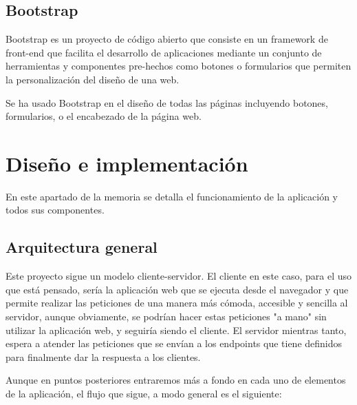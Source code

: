 \documentclass[a4paper, 12pt]{book}
\begin{document}
\section{Bootstrap}
\label{sec:Bootstrap}

Bootstrap es un proyecto de código abierto que consiste en un framework de front-end que facilita el desarrollo de aplicaciones mediante un conjunto de herramientas y componentes pre-hechos como botones o formularios que permiten la personalización del diseño de una web.

Se ha usado Bootstrap en el diseño de todas las páginas incluyendo botones, formularios, o el encabezado de la página web.



\cleardoublepage
\chapter{Diseño e implementación}
\label{sec:diseno}

En este apartado de la memoria se detalla el funcionamiento de la aplicación y todos sus componentes.



\section{Arquitectura general}
\label{sec:arquitectura}

Este proyecto sigue un modelo cliente-servidor. El cliente en este caso, para el uso que está pensado, sería la aplicación web que se ejecuta desde el navegador y que permite realizar las peticiones de una manera más cómoda, accesible y sencilla al servidor, aunque obviamente, se podrían hacer estas peticiones "a mano" sin utilizar la aplicación web, y seguiría siendo el cliente. El servidor mientras tanto, espera a atender las peticiones que se envían a los endpoints que tiene definidos para finalmente dar la respuesta a los clientes.


Aunque en puntos posteriores entraremos más a fondo en cada uno de elementos de la aplicación, el flujo que sigue, a modo general es el siguiente:
\end{document}
